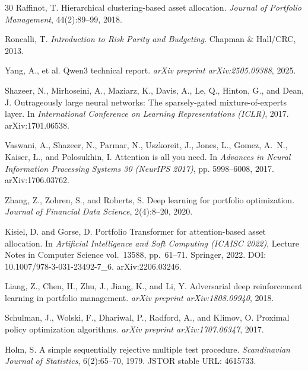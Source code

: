 \begin{thebibliography}{30}
Raffinot, T.
\newblock Hierarchical clustering-based asset allocation.
\newblock \emph{Journal of Portfolio Management}, 44(2):89--99, 2018.

Roncalli, T.
\newblock \emph{Introduction to Risk Parity and Budgeting}.
\newblock Chapman \& Hall/CRC, 2013.

Yang, A., et al.
\newblock Qwen3 technical report.
\newblock \emph{arXiv preprint arXiv:2505.09388}, 2025.

Shazeer, N., Mirhoseini, A., Maziarz, K., Davis, A., Le, Q., Hinton, G., and Dean, J.
\newblock Outrageously large neural networks: The sparsely-gated mixture-of-experts layer.
\newblock In \emph{International Conference on Learning Representations (ICLR)}, 2017. arXiv:1701.06538.

Vaswani, A., Shazeer, N., Parmar, N., Uszkoreit, J., Jones, L., Gomez, A.~N., Kaiser, {\L}., and Polosukhin, I.
\newblock Attention is all you need.
\newblock In \emph{Advances in Neural Information Processing Systems 30 (NeurIPS 2017)}, pp. 5998--6008, 2017. arXiv:1706.03762.

Zhang, Z., Zohren, S., and Roberts, S.
\newblock Deep learning for portfolio optimization.
\newblock \emph{Journal of Financial Data Science}, 2(4):8--20, 2020.

Kisiel, D. and Gorse, D.
\newblock Portfolio Transformer for attention-based asset allocation.
\newblock In \emph{Artificial Intelligence and Soft Computing (ICAISC 2022)}, Lecture Notes in Computer Science vol.~13588, pp.~61--71. Springer, 2022.
\newblock DOI: 10.1007/978-3-031-23492-7\_6. arXiv:2206.03246.

Liang, Z., Chen, H., Zhu, J., Jiang, K., and Li, Y.
\newblock Adversarial deep reinforcement learning in portfolio management.
\newblock \emph{arXiv preprint arXiv:1808.09940}, 2018.

Schulman, J., Wolski, F., Dhariwal, P., Radford, A., and Klimov, O.
\newblock Proximal policy optimization algorithms.
\newblock \emph{arXiv preprint arXiv:1707.06347}, 2017.

Holm, S.
\newblock A simple sequentially rejective multiple test procedure.
\newblock \emph{Scandinavian Journal of Statistics}, 6(2):65--70, 1979.
\newblock JSTOR stable URL: 4615733.


\end{thebibliography}
